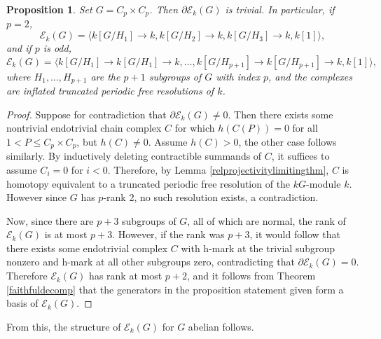 \documentclass[10pt,letterpaper, boxed, cm]{amsart}
\newcommand{\calE}{\mathcal{E}}
\newtheorem{prop}[theorem]{Proposition}
\theoremstyle{remark}
\theoremstyle{definition}
\begin{document}
	\begin{prop}\label{prank2}
		Set $G = C_p \times C_p$. Then $\partial \calE_k(G)$ is trivial. In particular, if $p = 2$, \[\calE_k(G) = \langle  k[G/H_1] \to k, k[G/H_2] \to k, k[G/H_{3}] \to k, k[1] \rangle,\] and if $p$ is odd, \[\calE_k(G) = \langle k[G/H_1] \to k[G/H_1] \to k, \dots, k[G/H_{p+1}]\to k[G/H_{p+1}] \to k, k[1] \rangle,\] where $H_1,\dots, H_{p+1}$ are the $p+1$ subgroups of $G$ with index $p$, and the complexes are inflated truncated periodic free resolutions of $k$.
	\end{prop}
	\begin{proof}
		Suppose for contradiction that $\partial \calE_k(G) \neq 0$. Then there exists some nontrivial endotrivial chain complex $C$ for which $h(C(P)) = 0$ for all $1 < P \leq C_p \times C_p$, but $h(C) \neq 0$. Assume $h(C) > 0$, the other case follows similarly. By inductively deleting contractible summands of $C$, it suffices to assume $C_i = 0$ for $i < 0$. Therefore, by Lemma \ref{relprojectivitylimitingthm}, $C$ is homotopy equivalent to a truncated periodic free resolution of the $kG$-module $k$. However since $G$ has $p$-rank 2, no such resolution exists, a contradiction.

        Now, since there are $p+3$ subgroups of $G$, all of which are normal, the rank of $\calE_k(G)$ is at most $p+3$. However, if the rank was $p+3$, it would follow that there exists some endotrivial complex $C$ with h-mark at the trivial subgroup nonzero and h-mark at all other subgroups zero, contradicting that $\partial \calE_k(G) = 0$. Therefore $\calE_k(G)$ has rank at most $p+2$, and it follows from Theorem \ref{faithfuldecomp} that the generators in the proposition statement given form a basis of $\calE_k(G)$.
	\end{proof}

	From this, the structure of $\calE_k(G)$ for $G$ abelian follows.
\end{document}
